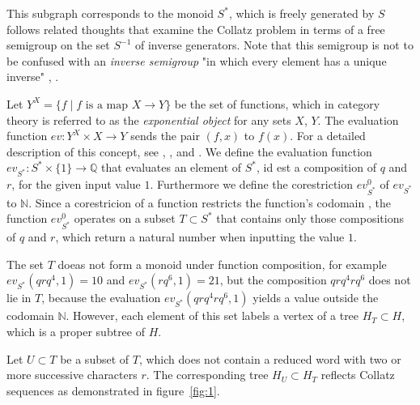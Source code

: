 This subgraph corresponds to the monoid $S^\ast$, which is freely generated by $S$ follows related thoughts \cite{Ref_Truemper_2014} that examine the Collatz problem in terms of a free semigroup on the set $S^{-1}$ of inverse generators. Note that this semigroup is not to be confused with an \textit{inverse semigroup} "in which every element has a unique inverse" \cite[p.~26]{Ref_Almeida}, \cite[p.~22]{Ref_Loeh}.

Let $Y^X=\{f\mid f\text{ is a map }X\rightarrow Y\}$ be the set of functions, which in category theory is referred to as the \textit{exponential object} for any sets $X$, $Y$. The evaluation function $ev:Y^X\times X\to Y$ sends the pair $(f,x)$ to $f(x)$. For a detailed description of this concept, see \cite[p.~127]{Ref_Johnsonbaugh}, \cite[p.~155]{Ref_MacLane_Birkhoff}, \cite[p.~54]{Ref_Novak_etal} and \cite[p.~188]{Ref_Pellissier}. We define the evaluation function $ev_{S^\ast}:S^\ast\times\{1\}\rightarrow\mathbb{Q}$ that evaluates an element of $S^\ast$, id est a composition of $q$ and $r$, for the given input value $1$. Furthermore we define the corestriction ${ev^0_{S^\ast}}$ of $ev_{S^\ast}$ to $\mathbb{N}$. Since a corestricion of a function restricts the function's codomain \cite[p.~3]{Ref_Helemskii}, the function $ev^0_{S^\ast}$ operates on a subset $T\subset S^\ast$ that contains only those compositions of $q$ and $r$, which return a natural number when inputting the value $1$.

The set $T$ doeas not form a monoid under function composition, for example $ev_{S^\ast}(qrq^4,1)=10$ and $ev_{S^\ast}(rq^6,1)=21$, but the composition $qrq^4rq^6$ does not lie in $T$, because the evaluation $ev_{S^\ast}(qrq^4rq^6,1)$ yields a value outside the codomain $\mathbb{N}$. However, each element of this set labels a vertex of a tree $H_{T}\subset H$, which is a proper subtree of $H$.

Let $U\subset T$ be a subset of $T$, which does not contain a reduced word with two or more successive characters $r$. The corresponding tree $H_{U}\subset H_{T}$ reflects Collatz sequences as demonstrated in figure~\ref{fig:1}.


